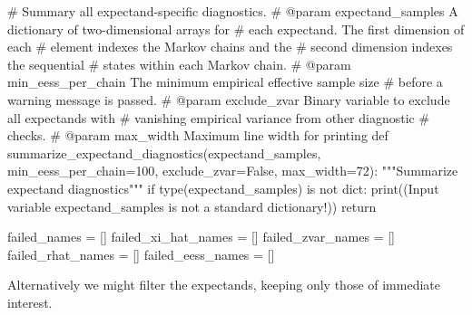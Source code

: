 \documentclass[
  letterpaper,
  DIV=11,
  numbers=noendperiod]{scrartcl}
\newenvironment{Shaded}{\begin{snugshade}}{\end{snugshade}}
\newcommand{\BuiltInTok}[1]{\textcolor[rgb]{0.00,0.23,0.31}{#1}}
\newcommand{\CommentTok}[1]{\textcolor[rgb]{0.37,0.37,0.37}{#1}}
\newcommand{\ControlFlowTok}[1]{\textcolor[rgb]{0.00,0.23,0.31}{#1}}
\newcommand{\DecValTok}[1]{\textcolor[rgb]{0.68,0.00,0.00}{#1}}
\newcommand{\KeywordTok}[1]{\textcolor[rgb]{0.00,0.23,0.31}{#1}}
\newcommand{\NormalTok}[1]{\textcolor[rgb]{0.00,0.23,0.31}{#1}}
\newcommand{\OperatorTok}[1]{\textcolor[rgb]{0.37,0.37,0.37}{#1}}
\newcommand{\StringTok}[1]{\textcolor[rgb]{0.13,0.47,0.30}{#1}}
\newcommand{\VariableTok}[1]{\textcolor[rgb]{0.07,0.07,0.07}{#1}}
\begin{document}
\begin{Shaded}
\begin{Highlighting}[]
\CommentTok{\# Summary all expectand{-}specific diagnostics.}
\CommentTok{\# @param expectand\_samples A dictionary of two{-}dimensional arrays for }
\CommentTok{\#                          each expectand.  The first dimension of each}
\CommentTok{\#                          element indexes the Markov chains and the }
\CommentTok{\#                          second dimension indexes the sequential }
\CommentTok{\#                          states within each Markov chain.}
\CommentTok{\# @param min\_eess\_per\_chain The minimum empirical effective sample size}
\CommentTok{\#                           before a warning message is passed.}
\CommentTok{\# @param exclude\_zvar Binary variable to exclude all expectands with}
\CommentTok{\#                     vanishing empirical variance from other diagnostic}
\CommentTok{\#                     checks.}
\CommentTok{\# @param max\_width Maximum line width for printing}
\KeywordTok{def}\NormalTok{ summarize\_expectand\_diagnostics(expectand\_samples,}
\NormalTok{                                    min\_eess\_per\_chain}\OperatorTok{=}\DecValTok{100}\NormalTok{,}
\NormalTok{                                    exclude\_zvar}\OperatorTok{=}\VariableTok{False}\NormalTok{,}
\NormalTok{                                    max\_width}\OperatorTok{=}\DecValTok{72}\NormalTok{):}
  \CommentTok{"""Summarize expectand diagnostics"""}
  \ControlFlowTok{if} \BuiltInTok{type}\NormalTok{(expectand\_samples) }\KeywordTok{is} \KeywordTok{not} \BuiltInTok{dict}\NormalTok{:}
    \BuiltInTok{print}\NormalTok{((}\StringTok{\textquotesingle{}Input variable \textasciigrave{}expectand\_samples\textasciigrave{} \textquotesingle{}}
           \StringTok{\textquotesingle{}is not a standard dictionary!\textquotesingle{}}\NormalTok{))}
    \ControlFlowTok{return}
  
\NormalTok{  failed\_names }\OperatorTok{=}\NormalTok{ []}
\NormalTok{  failed\_xi\_hat\_names }\OperatorTok{=}\NormalTok{ []}
\NormalTok{  failed\_zvar\_names }\OperatorTok{=}\NormalTok{ []}
\NormalTok{  failed\_rhat\_names }\OperatorTok{=}\NormalTok{ []}
\NormalTok{  failed\_eess\_names }\OperatorTok{=}\NormalTok{ []}
\end{Highlighting}
\end{Shaded}

Alternatively we might filter the expectands, keeping only those of
immediate interest.
\end{document}
